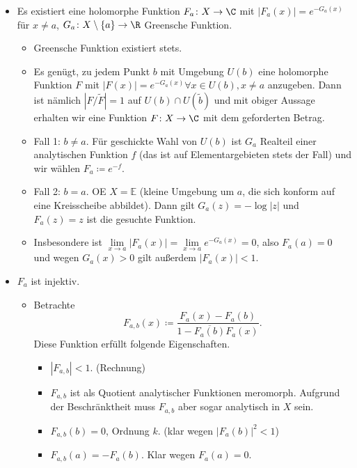\documentclass{article}
\begin{document}
        \begin{itemize}
            \item Es existiert eine holomorphe Funktion $F_a\colon X \to \C$ mit $|F_a(x)| = e^{-G_a(x)}$ für $x \neq a$, $G_a\colon X \setminus \{a\} \to \R$ Greensche Funktion.
            \begin{itemize}
                \item Greensche Funktion existiert stets.
                \item Es genügt, zu jedem Punkt $b$ mit Umgebung $U(b)$ eine holomorphe Funktion $F$ mit $|F(x)| = e^{-G_a(x)} \forall x \in U(b), x \neq a$ anzugeben. Dann ist nämlich $|F/\tilde{F}| = 1$ auf $U(b) \cap U(\tilde b)$ und mit obiger Aussage erhalten wir eine Funktion $F\colon X \to \C$ mit dem geforderten Betrag.
                \item Fall 1: $b \neq a$. Für geschickte Wahl von $U(b)$ ist $G_a$ Realteil einer analytischen Funktion $f$ (das ist auf Elementargebieten stets der Fall) und wir wählen $F_a \coloneqq e^{-f}$.
                \item Fall 2: $b = a$. OE $X = \mathbb{E}$ (kleine Umgebung um $a$, die sich konform auf eine Kreisscheibe abbildet). Dann gilt $G_a(z) = -\log|z|$ und $F_a(z) = z$ ist die gesuchte Funktion.
                \item Insbesondere ist $\lim\limits_{x \to a} |F_a(x)| = \lim\limits_{x \to a} e^{-G_a(x)} = 0$, also $F_a(a) = 0$ und wegen $G_a(x) > 0$ gilt außerdem $|F_a(x)| < 1$.
            \end{itemize}
            \item $F_a$ ist injektiv.
            \begin{itemize}
                \item Betrachte $$F_{a,b}(x) \coloneqq \frac{F_a(x) - F_a(b)}{1 - \overline{F_a(b)}F_a(x)}.$$ Diese Funktion erfüllt folgende Eigenschaften.
                \begin{itemize}
                    \item $|F_{a,b}| < 1$. (Rechnung)
                    \item $F_{a,b}$ ist als Quotient analytischer Funktionen meromorph. Aufgrund der Beschränktheit muss $F_{a,b}$ aber sogar analytisch in $X$ sein.
                    \item $F_{a,b}(b) = 0$, Ordnung $k$. (klar wegen $|F_a(b)|^2 < 1$)
                    \item $F_{a,b}(a) = -F_a(b)$. Klar wegen $F_a(a) = 0$.
                \end{itemize}

\end{itemize}
\end{itemize}
\end{document}
